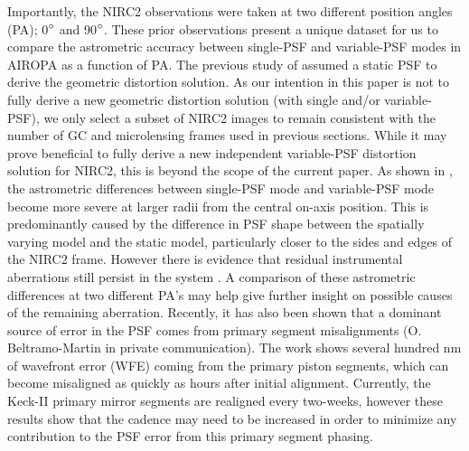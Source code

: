 \documentclass[]{spie}  %
\begin{document}
Importantly, the NIRC2 observations were taken at two different position angles (PA); 0$\degree$ and 90$\degree$. These prior observations present a unique dataset for us to compare the astrometric accuracy between single-PSF and variable-PSF modes in AIROPA as a function of PA. The previous study of \cite{service:2016a} assumed a static PSF to derive the geometric distortion solution. As our intention in this paper is not to fully derive a new geometric distortion solution (with single and/or variable-PSF), we only select a subset of NIRC2 images to remain consistent with the number of GC and microlensing frames used in previous sections. While it may prove beneficial to fully derive a new independent variable-PSF distortion solution for NIRC2, this is beyond the scope of the current paper. As shown in \cite{Turri:inprep}, the astrometric differences between single-PSF mode and variable-PSF mode become more severe at larger radii from the central on-axis position. This is predominantly caused by the difference in PSF shape between the spatially varying model and the static model, particularly closer to the sides and edges of the NIRC2 frame. However there is evidence that residual instrumental aberrations still persist in the system \citep{Turri:inprep}. A comparison of these astrometric differences at two different PA's may help give further insight on possible causes of the remaining aberration. Recently, it has also been shown that a dominant source of error in the PSF comes from primary segment misalignments (O. Beltramo-Martin in private communication). The work shows several hundred nm of wavefront error (WFE) coming from the primary piston segments, which can become misaligned as quickly as hours after initial alignment. Currently, the Keck-II primary mirror segments are realigned every two-weeks, however these results show that the cadence may need to be increased in order to minimize any contribution to the PSF error from this primary segment phasing.
\end{document}
